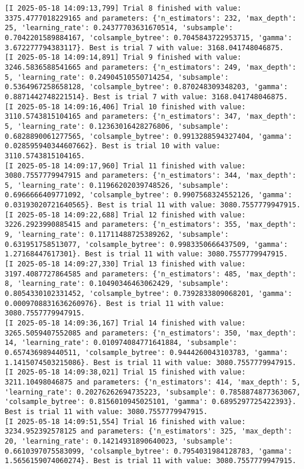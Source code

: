 \documentclass[
  letterpaper,
  DIV=11,
  numbers=noendperiod]{scrreprt}
\begin{document}
\begin{verbatim}
[I 2025-05-18 14:09:13,799] Trial 8 finished with value: 3375.4777018229165 and parameters: {'n_estimators': 232, 'max_depth': 25, 'learning_rate': 0.24377703631670514, 'subsample': 0.7042201589884167, 'colsample_bytree': 0.7045843722953715, 'gamma': 3.672277794383117}. Best is trial 7 with value: 3168.041748046875.
[I 2025-05-18 14:09:14,891] Trial 9 finished with value: 3246.5836588541665 and parameters: {'n_estimators': 249, 'max_depth': 5, 'learning_rate': 0.24904510550714254, 'subsample': 0.5364967258658128, 'colsample_bytree': 0.870248309348203, 'gamma': 0.8871442748221514}. Best is trial 7 with value: 3168.041748046875.
[I 2025-05-18 14:09:16,406] Trial 10 finished with value: 3110.5743815104165 and parameters: {'n_estimators': 347, 'max_depth': 5, 'learning_rate': 0.12363016428276806, 'subsample': 0.6828890061277565, 'colsample_bytree': 0.9913288594327404, 'gamma': 0.028595940344607662}. Best is trial 10 with value: 3110.5743815104165.
[I 2025-05-18 14:09:17,960] Trial 11 finished with value: 3080.7557779947915 and parameters: {'n_estimators': 344, 'max_depth': 5, 'learning_rate': 0.11966202039748526, 'subsample': 0.6966666409771092, 'colsample_bytree': 0.9907568324552126, 'gamma': 0.03193020721640565}. Best is trial 11 with value: 3080.7557779947915.
[I 2025-05-18 14:09:22,688] Trial 12 finished with value: 3226.2923990885415 and parameters: {'n_estimators': 355, 'max_depth': 9, 'learning_rate': 0.11711488725389262, 'subsample': 0.631951758513077, 'colsample_bytree': 0.9983350666437509, 'gamma': 1.27168447617301}. Best is trial 11 with value: 3080.7557779947915.
[I 2025-05-18 14:09:27,330] Trial 13 finished with value: 3197.4087727864585 and parameters: {'n_estimators': 485, 'max_depth': 8, 'learning_rate': 0.10490346463062429, 'subsample': 0.8054330102331452, 'colsample_bytree': 0.7392833809068201, 'gamma': 0.0009708831636260976}. Best is trial 11 with value: 3080.7557779947915.
[I 2025-05-18 14:09:36,167] Trial 14 finished with value: 3265.5059407552085 and parameters: {'n_estimators': 350, 'max_depth': 14, 'learning_rate': 0.010974084771641884, 'subsample': 0.657436989440511, 'colsample_bytree': 0.9444260043103783, 'gamma': 1.1415074503215086}. Best is trial 11 with value: 3080.7557779947915.
[I 2025-05-18 14:09:38,021] Trial 15 finished with value: 3211.10498046875 and parameters: {'n_estimators': 414, 'max_depth': 5, 'learning_rate': 0.20276262694735223, 'subsample': 0.7858874877363067, 'colsample_bytree': 0.8156010945025101, 'gamma': 0.6895297725422393}. Best is trial 11 with value: 3080.7557779947915.
[I 2025-05-18 14:09:51,554] Trial 16 finished with value: 3234.952392578125 and parameters: {'n_estimators': 325, 'max_depth': 20, 'learning_rate': 0.14214931890640023, 'subsample': 0.6610397075583099, 'colsample_bytree': 0.7954031984128783, 'gamma': 1.5656159074060274}. Best is trial 11 with value: 3080.7557779947915.

\end{verbatim}
\end{document}
